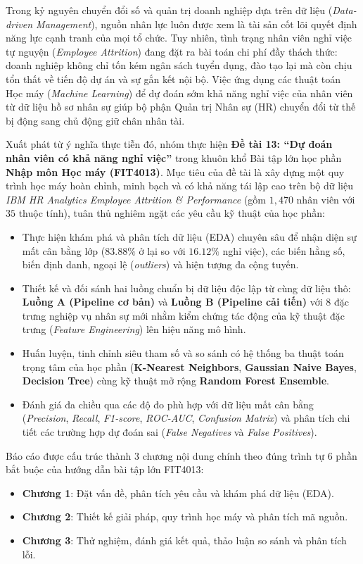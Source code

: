 
Trong kỷ nguyên chuyển đổi số và quản trị doanh nghiệp dựa trên dữ liệu (\textit{Data-driven Management}), nguồn nhân lực luôn được xem là tài sản cốt lõi quyết định năng lực cạnh tranh của mọi tổ chức. Tuy nhiên, tình trạng nhân viên nghỉ việc tự nguyện (\textit{Employee Attrition}) đang đặt ra bài toán chi phí đầy thách thức: doanh nghiệp không chỉ tốn kém ngân sách tuyển dụng, đào tạo lại mà còn chịu tổn thất về tiến độ dự án và sự gắn kết nội bộ. Việc ứng dụng các thuật toán Học máy (\textit{Machine Learning}) để dự đoán sớm khả năng nghỉ việc của nhân viên từ dữ liệu hồ sơ nhân sự giúp bộ phận Quản trị Nhân sự (HR) chuyển đổi từ thế bị động sang chủ động giữ chân nhân tài.

Xuất phát từ ý nghĩa thực tiễn đó, nhóm thực hiện \textbf{Đề tài 13: ``Dự đoán nhân viên có khả năng nghỉ việc''} trong khuôn khổ Bài tập lớn học phần \textbf{Nhập môn Học máy (FIT4013)}. Mục tiêu của đề tài là xây dựng một quy trình học máy hoàn chỉnh, minh bạch và có khả năng tái lập cao trên bộ dữ liệu \textit{IBM HR Analytics Employee Attrition \& Performance} (gồm $1,470$ nhân viên với $35$ thuộc tính), tuân thủ nghiêm ngặt các yêu cầu kỹ thuật của học phần:
\begin{itemize}
    \item Thực hiện khám phá và phân tích dữ liệu (EDA) chuyên sâu để nhận diện sự mất cân bằng lớp ($83.88\%$ ở lại so với $16.12\%$ nghỉ việc), các biến hằng số, biến định danh, ngoại lệ (\textit{outliers}) và hiện tượng đa cộng tuyến.
    \item Thiết kế và đối sánh hai luồng chuẩn bị dữ liệu độc lập từ cùng dữ liệu thô: \textbf{Luồng A (Pipeline cơ bản)} và \textbf{Luồng B (Pipeline cải tiến)} với $8$ đặc trưng nghiệp vụ nhân sự mới nhằm kiểm chứng tác động của kỹ thuật đặc trưng (\textit{Feature Engineering}) lên hiệu năng mô hình.
    \item Huấn luyện, tinh chỉnh siêu tham số và so sánh có hệ thống ba thuật toán trọng tâm của học phần (\textbf{K-Nearest Neighbors}, \textbf{Gaussian Naive Bayes}, \textbf{Decision Tree}) cùng kỹ thuật mở rộng \textbf{Random Forest Ensemble}.
    \item Đánh giá đa chiều qua các độ đo phù hợp với dữ liệu mất cân bằng (\textit{Precision}, \textit{Recall}, \textit{F1-score}, \textit{ROC-AUC}, \textit{Confusion Matrix}) và phân tích chi tiết các trường hợp dự đoán sai (\textit{False Negatives} và \textit{False Positives}).
\end{itemize}

Báo cáo được cấu trúc thành $3$ chương nội dung chính theo đúng trình tự $6$ phần bắt buộc của hướng dẫn bài tập lớn FIT4013:
\begin{itemize}
    \item \textbf{Chương 1}: Đặt vấn đề, phân tích yêu cầu và khám phá dữ liệu (EDA).
    \item \textbf{Chương 2}: Thiết kế giải pháp, quy trình học máy và phân tích mã nguồn.
    \item \textbf{Chương 3}: Thử nghiệm, đánh giá kết quả, thảo luận so sánh và phân tích lỗi.
\end{itemize}
